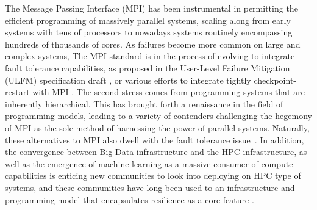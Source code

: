 \documentclass[sigconf]{acmart}
\begin{document}
The Message Passing Interface (MPI) has been instrumental in 
permitting the efficient programming of massively parallel systems, scaling 
along from early systems with tens of processors to nowadays systems routinely 
encompassing hundreds of thousands of cores. As failures become more 
common on large and complex systems, The MPI standard is in the process of 
evolving to integrate fault tolerance capabilities, as proposed in the 
User-Level Failure Mitigation (ULFM) specification draft \cite{ulfm13,Bland2013}, or 
various efforts to integrate tightly checkpoint-restart with MPI \cite{reinit18}.
The second stress comes from programming systems that are inherently
hierarchical. This has brought forth a renaissance in the field of
programming models, leading to a variety of contenders challenging the
hegemony of MPI as the sole method of harnessing the power of parallel systems.
Naturally, these alternatives to MPI also dwell with the fault tolerance
issue~\cite{parsec-ft, shmem-ft15, X10-ft16}. In addition, the convergence
between Big-Data infrastructure and the HPC infrastructure, as well as
the emergence of machine learning as a massive consumer of compute
capabilities is enticing new communities to look into deploying on HPC
type of systems, and these communities have long been used to an infrastructure
and programming model that encapsulates resilience as a core feature \cite{hadoop-ft}.
\end{document}
